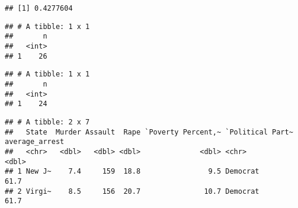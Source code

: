 \documentclass[]{article}
\newenvironment{Shaded}{\begin{snugshade}}{\end{snugshade}}
\newcommand{\CommentTok}[1]{\textcolor[rgb]{0.56,0.35,0.01}{\textit{#1}}}
\newcommand{\DataTypeTok}[1]{\textcolor[rgb]{0.13,0.29,0.53}{#1}}
\newcommand{\KeywordTok}[1]{\textcolor[rgb]{0.13,0.29,0.53}{\textbf{#1}}}
\newcommand{\NormalTok}[1]{#1}
\newcommand{\OperatorTok}[1]{\textcolor[rgb]{0.81,0.36,0.00}{\textbf{#1}}}
\newcommand{\StringTok}[1]{\textcolor[rgb]{0.31,0.60,0.02}{#1}}
\begin{document}
\begin{verbatim}
## [1] 0.4277604
\end{verbatim}

\begin{Shaded}
\end{Shaded}

\begin{verbatim}
## # A tibble: 1 x 1
##       n
##   <int>
## 1    26
\end{verbatim}

\begin{Shaded}
\end{Shaded}

\begin{verbatim}
## # A tibble: 1 x 1
##       n
##   <int>
## 1    24
\end{verbatim}

\begin{Shaded}
\end{Shaded}

\begin{verbatim}
## # A tibble: 2 x 7
##   State  Murder Assault  Rape `Poverty Percent,~ `Political Part~ average_arrest
##   <chr>   <dbl>   <dbl> <dbl>              <dbl> <chr>                     <dbl>
## 1 New J~    7.4     159  18.8                9.5 Democrat                   61.7
## 2 Virgi~    8.5     156  20.7               10.7 Democrat                   61.7
\end{verbatim}
\end{document}
